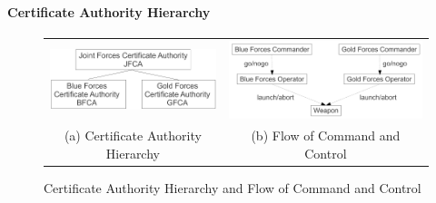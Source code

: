 \documentclass[10pt,twoside]{article}
\begin{document}
\paragraph{Certificate Authority Hierarchy}
\begin{figure}[t]
  \centering
  \begin{tabular}[t]{cc}
    \begin{minipage}{0.48\linewidth}
      \centering
      \includegraphics[width=0.95\linewidth]{Figures/CAHierarchy}
    \end{minipage}
    &
    \begin{minipage}{0.48\linewidth}
      \centering
      \includegraphics[width=0.95\linewidth]{Figures/conops}
    \end{minipage}\\
    (a) Certificate Authority Hierarchy & (b) Flow of Command and Control\\
  \end{tabular}
  
  \caption{Certificate Authority Hierarchy and Flow of Command and Control}
\label{fig:ca-hierarchy-c2-flow}
\end{figure}
\end{document}

